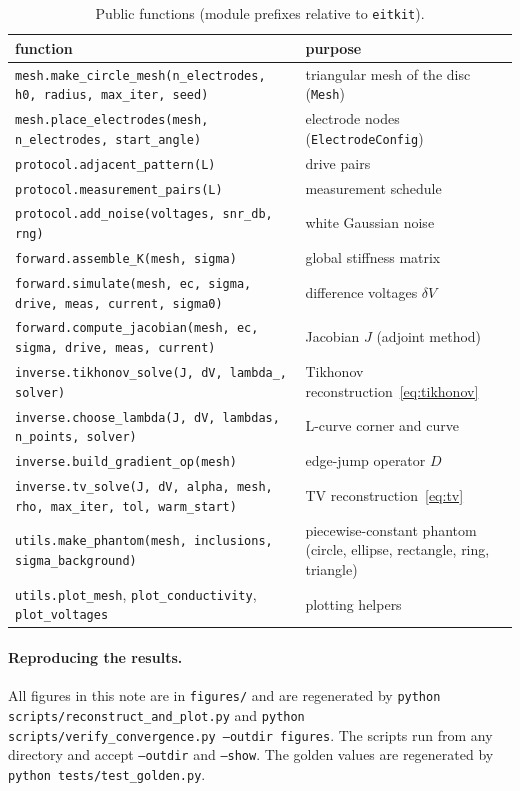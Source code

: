 \documentclass[11pt,a4paper]{article}
\newcommand{\code}[1]{\texttt{#1}}
\newcommand{\dV}{\delta V}
\begin{document}
\begin{table}[ht]
\centering
\small
\caption{Public functions (module prefixes relative to \code{eitkit}).}
\label{tab:api}
\begin{tabular}{@{}p{}p{}@{}}
\toprule
function & purpose \\
\midrule
\code{mesh.make\_circle\_mesh(n\_electrodes, h0, radius, max\_iter, seed)}
  & triangular mesh of the disc (\code{Mesh}) \\
\code{mesh.place\_electrodes(mesh, n\_electrodes, start\_angle)}
  & electrode nodes (\code{ElectrodeConfig}) \\
\code{protocol.adjacent\_pattern(L)} & drive pairs \\
\code{protocol.measurement\_pairs(L)} & measurement schedule \\
\code{protocol.add\_noise(voltages, snr\_db, rng)} & white Gaussian noise \\
\code{forward.assemble\_K(mesh, sigma)} & global stiffness matrix \\
\code{forward.simulate(mesh, ec, sigma, drive, meas, current, sigma0)}
  & difference voltages $\dV$ \\
\code{forward.compute\_jacobian(mesh, ec, sigma, drive, meas, current)}
  & Jacobian $J$ (adjoint method) \\
\code{inverse.tikhonov\_solve(J, dV, lambda\_, solver)}
  & Tikhonov reconstruction~\eqref{eq:tikhonov} \\
\code{inverse.choose\_lambda(J, dV, lambdas, n\_points, solver)}
  & L-curve corner and curve \\
\code{inverse.build\_gradient\_op(mesh)} & edge-jump operator $D$ \\
\code{inverse.tv\_solve(J, dV, alpha, mesh, rho, max\_iter, tol, warm\_start)}
  & TV reconstruction~\eqref{eq:tv} \\
\code{utils.make\_phantom(mesh, inclusions, sigma\_background)}
  & piecewise-constant phantom (circle, ellipse, rectangle, ring, triangle) \\
\code{utils.plot\_mesh}, \code{plot\_conductivity}, \code{plot\_voltages}
  & plotting helpers \\
\bottomrule
\end{tabular}
\end{table}

\paragraph{Reproducing the results.} All figures in this note are in
\code{figures/} and are regenerated by \code{python
scripts/reconstruct\_and\_plot.py} and \code{python
scripts/verify\_convergence.py --outdir figures}. The scripts run from any
directory and accept \code{--outdir} and \code{--show}. The golden values
are regenerated by \code{python tests/test\_golden.py}.
\end{document}
